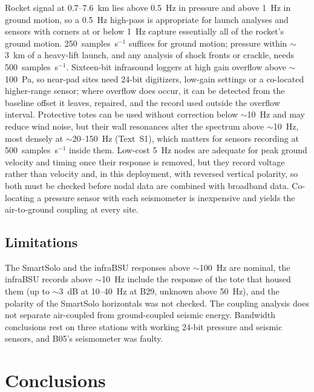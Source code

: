 \documentclass[]{seismica}
\begin{document}
Rocket signal at 0.7--7.6~km lies above 0.5~Hz in pressure and above
1~Hz in ground motion, so a 0.5~Hz high-pass is appropriate for launch
analyses and sensors with corners at or below 1~Hz capture essentially
all of the rocket's ground motion. 250~samples~s$^{-1}$ suffices for
ground motion; pressure within $\sim$3~km of a heavy-lift launch, and
any analysis of shock fronts or crackle, needs 500~samples~s$^{-1}$.
Sixteen-bit infrasound loggers at high gain overflow above
$\sim$100~Pa, so near-pad sites need 24-bit digitizers, low-gain
settings or a co-located higher-range sensor; where overflow does occur,
it can be detected from the baseline offset it leaves, repaired, and the
record used outside the overflow interval. Protective totes can be used
without correction below $\sim$10~Hz and may reduce wind noise, but their
wall resonances alter the spectrum above $\sim$10~Hz, most densely at
$\sim$20--150~Hz (Text~S1), which matters for sensors recording at
500~samples~s$^{-1}$ inside them. Low-cost 5~Hz nodes are
adequate for peak ground velocity and timing once their response is
removed, but they record voltage rather than velocity and, in this
deployment, with reversed vertical polarity, so both must be checked
before nodal data are combined with broadband data. Co-locating a
pressure sensor with each seismometer is inexpensive and yields the
air-to-ground coupling at every site.

\subsection{Limitations}

The SmartSolo and the infraBSU responses above $\sim$100~Hz are nominal,
the infraBSU records above $\sim$10~Hz include the response of the tote
that housed them (up to $\sim$3~dB at 10--40~Hz at B29, unknown above
50~Hz),
and the polarity of the SmartSolo horizontals was not checked. The
coupling analysis does not separate air-coupled from ground-coupled
seismic energy. Bandwidth conclusions rest on three stations with working
24-bit pressure and seismic sensors, and B05's seismometer was faulty.


\section{Conclusions}
\end{document}
